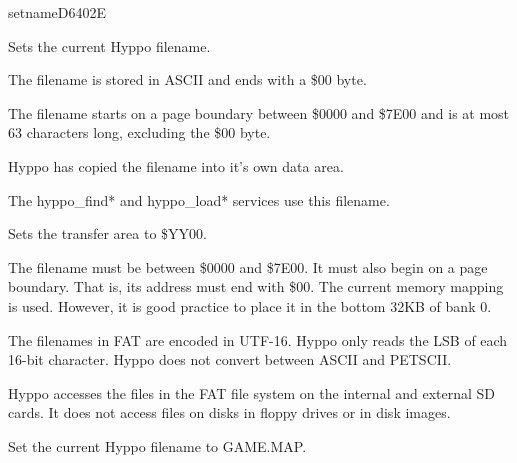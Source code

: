 \newpage
\begin{hyppotrap}{setname}{D640}{2E}
\item [Service:]
  Sets the current Hyppo filename.
\item [Preconditions:]
  The filename is stored in ASCII and ends with a \$00 byte.

  The filename starts on a page boundary between \$0000 and \$7E00 and is at
  most 63 characters long, excluding the \$00 byte.
\item [Inputs:]
\item [Postconditions:]
  Hyppo has copied the filename into it's own data area.

  The hyppo\_find* and hyppo\_load* services use this filename.
\item [Side effects:]
  Sets the transfer area to \$YY00.
\item [Errors:]
\item [History:]
\item [Remarks:]
  The filename must be between \$0000 and \$7E00. It must also begin on a
  page boundary. That is, its address must end with \$00. The current memory
  mapping is used. However, it is good practice to place it in the bottom 32KB
  of bank 0.

  The filenames in FAT are encoded in UTF-16. Hyppo only reads the LSB
  of each 16-bit character. Hyppo does not convert between ASCII and
  PETSCII.

  Hyppo accesses the files in the FAT file system on the internal and
  external SD cards. It does not access files on disks in floppy drives or in
  disk images.
\item [Example:]
  Set the current Hyppo filename to GAME.MAP.
\end{hyppotrap}


